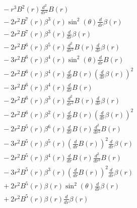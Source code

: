 \documentclass[11pt,a4paper]{article}
\begin{document}
\begin{align*}
  &\quad - r^{3} B^{2}{\left(r \right)} \frac{d^{2}}{d r^{2}} B{\left(r \right)} \\
  &\quad - 2 r^{2} B^{7}{\left(r \right)} \beta^{3}{\left(r \right)} \sin^{2}{\left(\theta \right)} \frac{d}{d r} \beta{\left(r \right)} \\
  &\quad - 2 r^{2} B^{7}{\left(r \right)} \beta^{3}{\left(r \right)} \frac{d}{d r} \beta{\left(r \right)} \\
  &\quad - 2 r^{2} B^{6}{\left(r \right)} \beta^{5}{\left(r \right)} \frac{d^{2}}{d r^{2}} B{\left(r \right)} \frac{d}{d r} \beta{\left(r \right)} \\
  &\quad - 3 r^{2} B^{6}{\left(r \right)} \beta^{4}{\left(r \right)} \sin^{2}{\left(\theta \right)} \frac{d}{d r} B{\left(r \right)} \\
  &\quad - 2 r^{2} B^{6}{\left(r \right)} \beta^{4}{\left(r \right)} \frac{d}{d r} B{\left(r \right)} \left(\frac{d}{d r} \beta{\left(r \right)}\right)^{2} \\
  &\quad - 3 r^{2} B^{6}{\left(r \right)} \beta^{4}{\left(r \right)} \frac{d}{d r} B{\left(r \right)} \\
  &\quad - 2 r^{2} B^{6}{\left(r \right)} \beta^{3}{\left(r \right)} \frac{d^{2}}{d r^{2}} B{\left(r \right)} \frac{d}{d r} \beta{\left(r \right)} \\
  &\quad - 2 r^{2} B^{6}{\left(r \right)} \beta^{2}{\left(r \right)} \frac{d}{d r} B{\left(r \right)} \left(\frac{d}{d r} \beta{\left(r \right)}\right)^{2} \\
  &\quad - 2 r^{2} B^{5}{\left(r \right)} \beta^{6}{\left(r \right)} \frac{d}{d r} B{\left(r \right)} \frac{d^{2}}{d r^{2}} B{\left(r \right)} \\
  &\quad - 3 r^{2} B^{5}{\left(r \right)} \beta^{5}{\left(r \right)} \left(\frac{d}{d r} B{\left(r \right)}\right)^{2} \frac{d}{d r} \beta{\left(r \right)} \\
  &\quad - 2 r^{2} B^{5}{\left(r \right)} \beta^{4}{\left(r \right)} \frac{d}{d r} B{\left(r \right)} \frac{d^{2}}{d r^{2}} B{\left(r \right)} \\
  &\quad - 3 r^{2} B^{5}{\left(r \right)} \beta^{3}{\left(r \right)} \left(\frac{d}{d r} B{\left(r \right)}\right)^{2} \frac{d}{d r} \beta{\left(r \right)} \\
  &\quad + 2 r^{2} B^{5}{\left(r \right)} \beta{\left(r \right)} \sin^{2}{\left(\theta \right)} \frac{d}{d r} \beta{\left(r \right)} \\
  &\quad + 2 r^{2} B^{5}{\left(r \right)} \beta{\left(r \right)} \frac{d}{d r} \beta{\left(r \right)} \\

\end{align*}
\end{document}
